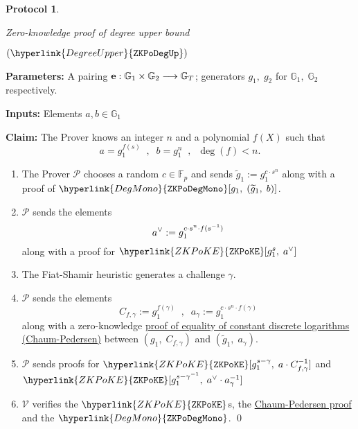 \documentclass[11pt, lettersize, notitlepage, leqno, footskip=0.6cm]{article}
\newcommand{\bFp}{\mathbb{F}_p}
\newcommand{\lra}{\longrightarrow}
\newcommand{\wti}{\widetilde}
\newcommand{\mc}{\mathcal}
\newcommand{\mb}{\mathbb}
\newcommand{\what}{\widehat}
\newcommand{\mP}{\mc{P}}
\newcommand{\V}{\mc{V}}
\newcommand{\vs}{\vspace{-0.15cm}}
\newtheorem{Prot}[Thm]{Protocol}
\numberwithin{equation}{section}
\begin{document}
\begin{mdframed}
\begin{Prot} \hypertarget{DegreeUpper}{Zero-knowledge proof of degree upper bound} $(\hyperlink{DegreeUpper}{\tt{ZKPoDegUp}})$\end{Prot}  

\noindent \textbf{Parameters:} A pairing ${\bf{e}}:\mb{G}_1\times \mb{G}_2\lra \mb{G}_T$; generators $g_1,\;g_2$ for $\mb{G}_1,\; \mb{G}_2$ respectively.


\noindent \textbf{Inputs:} Elements $a, b\in \mb{G}_1$

\noindent \textbf{Claim:} The Prover knows an integer $n$ and a polynomial $f(X)$  such that \vs $$a = g_1^{f(s)}\;\;,\;\; b = g_1^n \;\;,\;\; \deg(f) < n  .$$ 

\begin{enumerate}[wide, labelwidth=!, labelindent=0pt, itemsep=-0.2ex]

\item The Prover $\mP$ chooses a random $c\in \bFp$ and sends $\wti{g}_1:= g_1^{c\cdot s^n}$ along with a proof of $\hyperlink{DegMono}{\tt{ZKPoDegMono}}[g_1,\;(\wti{g}_1,\;b)]$.

\item $\mP$ sends the elements \vs $$a^{\vee}:= g_1^{c\cdot s^n\cdot f(s^{-1})}\vs $$ along with a proof for $\hyperlink{ZKPoKE}{\tt{ZKPoKE}}[g_1^s,\;a^{\vee}]$ 

\item The Fiat-Shamir heuristic generates a challenge $\gamma$.

\item $\mP$ sends the elements $$C_{f,\gamma}:= g_1^{f(\gamma)}\;\;,\;\; a_{\gamma}:= g_1^{c\cdot s^n\cdot f(\gamma)}   $$ along with a zero-knowledge \hyperlink{CP}{proof of equality of constant discrete logarithms (Chaum-Pedersen)} between $(g_1,\;C_{f,\gamma})$ and $(\wti{g}_1,\; a_{\gamma})$.


\item $\mP$ sends proofs for $\hyperlink{ZKPoKE}{\tt{ZKPoKE}}[g_1^{s-\gamma},\;a\cdot C_{f,\gamma}^{-1}]$ and $\hyperlink{ZKPoKE}{\tt{ZKPoKE}}[g_1^{s-\gamma^{-1}},\;a^{\vee}\cdot a_{\gamma}^{-1}]$

\item $\V$ verifies the $\hyperlink{ZKPoKE}{\tt{ZKPoKE}}$s, the \hyperlink{CP}{Chaum-Pedersen proof} and the $\hyperlink{DegMono}{\tt{ZKPoDegMono}}$. \qed \end{enumerate} \end{mdframed}
\end{document}
